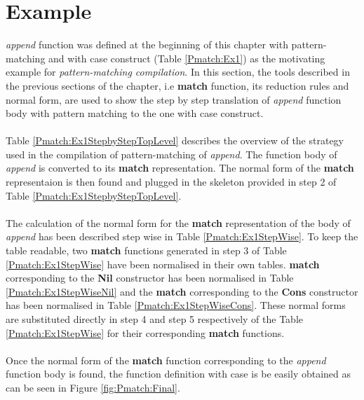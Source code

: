 \documentclass[11pt]{article}
\begin{document}
\section {Example}
 \textit{append} function was defined at the beginning of this chapter with pattern-matching and with {\sf case} construct (Table \ref {Pmatch:Ex1}) as the motivating example for {\em pattern-matching compilation}. In this section, the tools described in the previous sections of the chapter, i.e {\bf match} function, its reduction rules and normal form, are used to show the step by step translation of \textit{append} function body with pattern matching to the one with {\sf case} construct. 
~~\\~~\\
Table \ref{Pmatch:Ex1StepbyStepTopLevel} describes the overview of the strategy used in the compilation of pattern-matching of \textit{append}. The function body of \textit{append} is converted to its {\bf match} representation. The normal form of the {\bf match} representaion is then found and plugged in the skeleton provided in step 2  of Table \ref{Pmatch:Ex1StepbyStepTopLevel}.
~~\\~~\\
The calculation of the normal form for the  {\bf match} representation of the body of \textit{append} has been described step wise in Table \ref {Pmatch:Ex1StepWise}. To keep the table readable, two {\bf match} functions generated in step 3 of Table \ref {Pmatch:Ex1StepWise} have been normalised in their own tables. {\bf match} corresponding to the {\bf Nil} constructor has been normalised in Table \ref {Pmatch:Ex1StepWiseNil} and the {\bf match} corresponding to the  {\bf Cons} constructor has been normalised in Table \ref {Pmatch:Ex1StepWiseCons}. These normal forms are substituted directly in step 4 and step 5 respectively of the Table \ref {Pmatch:Ex1StepWise} for their corresponding {\bf match} functions.
~~\\~~\\
Once the normal form of the {\bf match} function corresponding to the \textit{append} function body is found, the function definition with {\sf case} is be easily obtained as can be seen in Figure \ref {fig:Pmatch:Final}.

\end{document}
